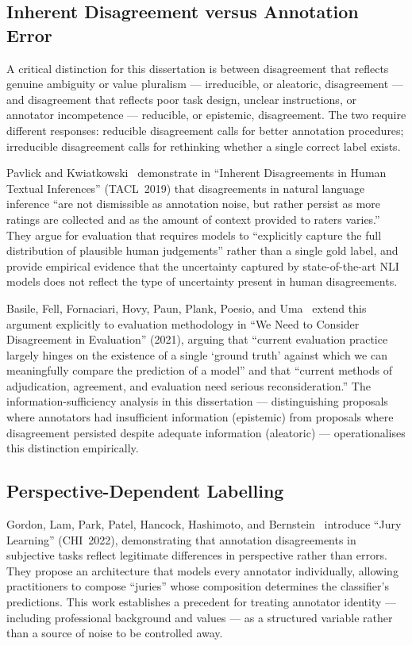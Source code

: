 \subsection{Inherent Disagreement versus Annotation Error}

A critical distinction for this dissertation is between disagreement that
reflects genuine ambiguity or value pluralism --- irreducible, or aleatoric,
disagreement --- and disagreement that reflects poor task design, unclear
instructions, or annotator incompetence --- reducible, or epistemic,
disagreement.  The two require different responses: reducible disagreement
calls for better annotation procedures; irreducible disagreement calls for
rethinking whether a single correct label exists.

Pavlick and Kwiatkowski~\cite{pavlick2019} demonstrate in ``Inherent
Disagreements in Human Textual Inferences'' (TACL~2019) that disagreements in
natural language inference ``are not dismissible as annotation noise, but
rather persist as more ratings are collected and as the amount of context
provided to raters varies.''  They argue for evaluation that requires models
to ``explicitly capture the full distribution of plausible human judgements''
rather than a single gold label, and provide empirical evidence that the
uncertainty captured by state-of-the-art NLI models does not reflect the type
of uncertainty present in human disagreements.

Basile, Fell, Fornaciari, Hovy, Paun, Plank, Poesio, and Uma~\cite{basile2021}
extend this argument explicitly to evaluation methodology in ``We Need to
Consider Disagreement in Evaluation'' (2021), arguing that ``current
evaluation practice largely hinges on the existence of a single `ground truth'
against which we can meaningfully compare the prediction of a model'' and that
``current methods of adjudication, agreement, and evaluation need serious
reconsideration.''  The information-sufficiency analysis in this dissertation
--- distinguishing proposals where annotators had insufficient information
(epistemic) from proposals where disagreement persisted despite adequate
information (aleatoric) --- operationalises this distinction empirically.

\subsection{Perspective-Dependent Labelling}

Gordon, Lam, Park, Patel, Hancock, Hashimoto, and Bernstein~\cite{gordon2022}
introduce ``Jury Learning'' (CHI~2022), demonstrating that annotation
disagreements in subjective tasks reflect legitimate differences in perspective
rather than errors.  They propose an architecture that models every annotator
individually, allowing practitioners to compose ``juries'' whose composition
determines the classifier's predictions.  This work establishes a precedent
for treating annotator identity --- including professional background and
values --- as a structured variable rather than a source of noise to be
controlled away.

